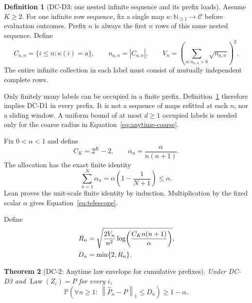 \documentclass[11pt]{article}
\newtheorem{theorem}{Theorem}[section]
\theoremstyle{definition}
\newtheorem{definition}[theorem]{Definition}
\newcommand{\cC}{\mathcal{C}}
\newcommand{\Phat}{\widehat{P}}
\newcommand{\Prb}{\mathbb{P}}
\newcommand{\normone}[1]{\left\lVert #1\right\rVert_1}
\begin{document}
\begin{definition}[DC-D3: one nested infinite sequence and its prefix loads]
\label{def:dc-prefix}
Assume $K\ge2$.  For one infinite row sequence, fix a single map
$\kappa:\mathbb N_{\ge1}\to\cC$ before evaluation outcomes.  Prefix $n$ is always the first $n$
rows of this same nested sequence.  Define
\begin{equation}
  C_{a,n}=\{i\le n:\kappa(i)=a\},
  \qquad
  n_{a,n}=|C_{a,n}|,
  \qquad
  V_n=\left(\sum_{a:n_{a,n}>0}\sqrt{n_{a,n}}\right)^2.
\end{equation}
The entire infinite collection in each label must consist of mutually independent complete rows.
\end{definition}

Only finitely many labels can be occupied in a finite prefix.  Definition~\ref{def:dc-prefix}
therefore implies DC-D1 in every prefix.  It is not a sequence of maps refitted at each $n$, nor a
sliding window.  A uniform bound of at most $d\ge1$ occupied labels is needed only for the coarse
radius in Equation~\eqref{eq:anytime-coarse}.

Fix $0<\alpha<1$ and define
\begin{equation}
  C_K=2^K-2,
  \qquad
  \alpha_n=\frac{\alpha}{n(n+1)}.
\end{equation}
The allocation has the exact finite identity
\begin{equation}\label{eq:telescope}
  \sum_{n=1}^{N}\alpha_n
  =\alpha\left(1-\frac1{N+1}\right)
  \le\alpha.
\end{equation}
Lean proves the unit-scale finite identity by induction.  Multiplication by the fixed scalar
$\alpha$ gives Equation~\eqref{eq:telescope}.

Define
\begin{align}
  R_n
  &=\sqrt{%
      \frac{2V_n}{n^2}
      \log\!\left(\frac{C_Kn(n+1)}{\alpha}\right)
    }, \\
  D_n&=\min\{2,R_n\}.
\end{align}

\begin{theorem}[DC-2: Anytime law envelope for cumulative prefixes]\label{thm:anytime}
Under DC-D3 and $\operatorname{Law}(Z_i)=P$ for every $i$,
\begin{equation}\label{eq:anytime}
  \Prb\!\left(
    \forall n\ge1:\
    \normone{\Phat_n-P}\le D_n
  \right)\ge1-\alpha.
\end{equation}
\end{theorem}
\end{document}
